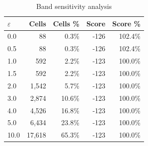 \begin{table}[htbp]
\centering
\caption{Band sensitivity analysis}
\begin{tabular}{lrrrr}
\hline
$\varepsilon$ & Cells & Cells \% & Score & Score \% \\
\hline
0.0 & 88 & 0.3\% & -126 & 102.4\% \\
0.5 & 88 & 0.3\% & -126 & 102.4\% \\
1.0 & 592 & 2.2\% & -123 & 100.0\% \\
1.5 & 592 & 2.2\% & -123 & 100.0\% \\
2.0 & 1,542 & 5.7\% & -123 & 100.0\% \\
3.0 & 2,874 & 10.6\% & -123 & 100.0\% \\
4.0 & 4,526 & 16.8\% & -123 & 100.0\% \\
5.0 & 6,434 & 23.8\% & -123 & 100.0\% \\
10.0 & 17,618 & 65.3\% & -123 & 100.0\% \\
\hline
\end{tabular}
\end{table}
